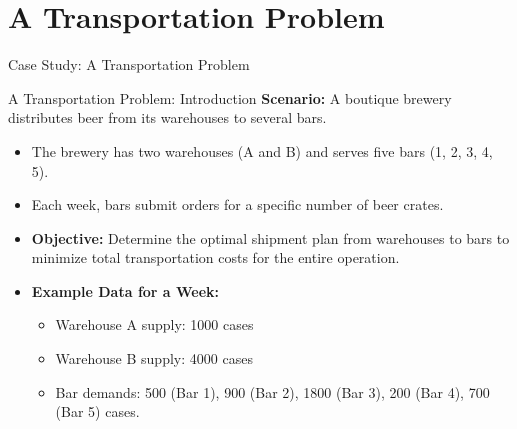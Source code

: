 \documentclass{purdue-slide}
\begin{document}
\section{A Transportation Problem}

\begin{titleframe}{Case Study: A Transportation Problem}

\end{titleframe}

\begin{frame}{A Transportation Problem: Introduction}
	\textbf{Scenario:} A boutique brewery distributes beer from its warehouses to several bars.
	\begin{itemize}
		\item The brewery has two warehouses (A and B) and serves five bars (1, 2, 3, 4, 5).
		\item Each week, bars submit orders for a specific number of beer crates.
		\item \textbf{Objective:} Determine the optimal shipment plan from warehouses to bars to minimize total transportation costs for the entire operation.
		\item \textbf{Example Data for a Week:}
			\begin{itemize}
				\item Warehouse A supply: 1000 cases
				\item Warehouse B supply: 4000 cases
				\item Bar demands: 500 (Bar 1), 900 (Bar 2), 1800 (Bar 3), 200 (Bar 4), 700 (Bar 5) cases.
			\end{itemize}
	\end{itemize}
\end{frame}

\end{document}
